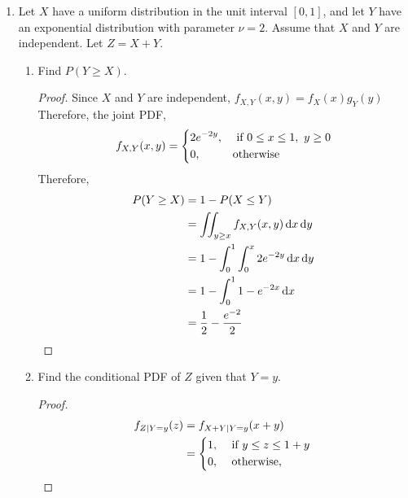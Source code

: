\documentclass[paper=usletter, fontsize=12pt]{article}
\begin{document}

    \begin{enumerate}

        \item Let $X$ have a uniform distribution in the unit interval $[0,1]$,
        and let $Y$ have an exponential distribution with parameter $\nu=2$.
        Assume that $X$ and $Y$ are independent. Let $Z=X+Y$.
        \begin{enumerate}

            \item Find $P(Y \ge X)$.
            \begin{proof}

                Since $X$ and $Y$ are independent,
                $f_{X,Y}(x,y)=f_X(x)g_Y(y)$\\
                Therefore, the joint PDF,
                \begin{equation*}
                    f_{X,Y}(x,y)=
                    \begin{dcases}
                        2e^{-2y}, & \text{ if } 0 \le x \le 1, \ y \ge 0\\
                        0, & \text{otherwise}
                    \end{dcases}
                \end{equation*}
                Therefore,
                \begin{align*}
                    P(Y \ge X) & = 1 - P(X \le Y) \\
                    & = \iint_{y \ge x}f_{X,Y}(x,y)\mathop{}\!\mathrm{d}{x}\mathop{}\!\mathrm{d}{y}\\
                    & = 1-\int_{0}^{1}\int_{0}^{x}2e^{-2y}\mathop{}\!\mathrm{d}{x}\mathop{}\!\mathrm{d}{y}\\
                    & = 1-\int_{0}^{1}1-e^{-2x}\mathop{}\!\mathrm{d}{x}\\
                    & = \frac{1}{2}-\frac{e^{-2}}{2} \qedhere
                \end{align*}
                \endgroup

            \end{proof}

            \item Find the conditional PDF of $Z$ given that $Y=y$.
            \begin{proof}

                \begin{align*}
                    f_{Z \mid Y=y}(z) & = f_{X+Y \mid Y=y}(x+y)\\
                    & = \begin{dcases}
                        1, & \text{ if } y \le z \le 1+y\\
                        0, & \text{ otherwise},
                    \end{dcases} \qedhere
                \end{align*}


\end{proof}
\end{enumerate}
\end{enumerate}
\end{document}
